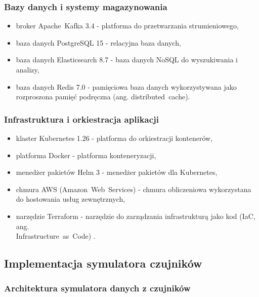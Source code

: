 \subsubsection{Bazy danych i systemy magazynowania}
\label{subsubsec:bazy_danych}

\begin{itemize}
    \item broker \mbox{Apache Kafka} 3.4 \cite{kafka} - platforma do przetwarzania strumieniowego,
    \item baza danych PostgreSQL 15 - relacyjna baza danych,
    \item baza danych Elasticsearch 8.7 - baza danych \mbox{NoSQL} \cite{nosql_definition} do wyszukiwania i analizy,
    \item baza danych Redis 7.0 - pamięciowa baza danych wykorzystywana jako rozproszona pamięć podręczna (ang. \mbox{distributed cache}).
\end{itemize}

\subsubsection{Infrastruktura i orkiestracja aplikacji}
\label{subsubsec:infrastruktura}

\begin{itemize}
    \item klaster Kubernetes 1.26 \cite{kubernetes} - platforma do orkiestracji kontenerów,
    \item platforma Docker - platforma konteneryzacji,
    \item menedżer pakietów Helm 3 - menedżer pakietów dla Kubernetes,
    \item chmura AWS (\mbox{Amazon Web Services}) \cite{aws_definition} - chmura obliczeniowa wykorzystana do hostowania usług zewnętrznych,
    \item narzędzie Terraform - narzędzie do zarządzania infrastrukturą jako kod (IaC, ang. \\ \mbox{Infrastructure as Code}) \cite{terraform_docs}.
\end{itemize}

\subsection{Implementacja symulatora czujników}
\label{subsec:implementacja_symulatora}

\subsubsection{Architektura symulatora danych z czujników}
\label{subsubsec:architektura_symulatora}

